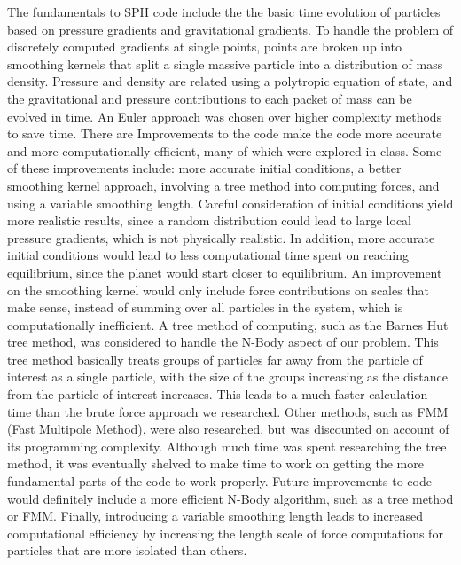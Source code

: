\documentclass[12pt]{article}
\begin{document}
The fundamentals to SPH code include the the basic time evolution of particles based on pressure gradients and gravitational gradients. To handle the problem of discretely computed gradients at single points, points are broken up into smoothing kernels that split a single massive particle into a distribution of mass density. Pressure and density are related using a polytropic equation of state, and the gravitational and pressure contributions to each packet of mass can be evolved in time. An Euler approach was chosen over higher complexity methods to save time. 
\newline\indent
There are Improvements to the code make the code more accurate and more computationally efficient, many of which were explored in class. Some of these improvements include: more accurate initial conditions, a better smoothing kernel approach, involving a tree method into computing forces, and using a variable smoothing length. Careful consideration of initial conditions yield more realistic results, since a random distribution could lead to large local pressure gradients, which is not physically realistic. In addition, more accurate initial conditions would lead to less computational time spent on reaching equilibrium, since the planet would start closer to equilibrium. An improvement on the smoothing kernel would only include force contributions on scales that make sense, instead of summing over all particles in the system, which is computationally inefficient. 
\newline\indent
A tree method of computing, such as the Barnes Hut tree method, was considered to handle the N-Body aspect of our problem. This tree method basically treats groups of particles far away from the particle of interest as a single particle, with the size of the groups increasing as the distance from the particle of interest increases. This leads to a much faster calculation time than the brute force approach we researched. Other methods, such as FMM (Fast Multipole Method), were also researched, but was discounted on account of its programming complexity. Although much time was spent researching the tree method, it was eventually shelved to make time to work on getting the more fundamental parts of the code to work properly. 
\newline\indent
Future improvements to code would definitely include a more efficient N-Body algorithm, such as a tree method or FMM. Finally, introducing a variable smoothing length leads to increased computational efficiency by increasing the length scale of force computations for particles that are more isolated than others.
\end{document}
